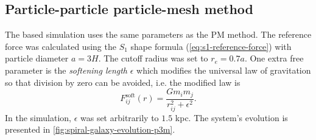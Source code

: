 \subsection{Particle-particle particle-mesh method}
The \PThreeM{} based simulation uses the same parameters as the PM method.
The reference force was calculated using the $S_1$ shape formula (\autoref{eq:s1-reference-force}) with particle diameter $a=3H$.
The cutoff radius was set to $r_e=0.7a$.
One extra free parameter is the \textit{softening length} $\epsilon$ which modifies the universal law of gravitation so that division by zero can be avoided, i.e. the modified law is
\begin{equation*}
    F^\text{soft}_{ij}(r) = \frac{G m_i m_j}{r_{ij}^2 + \epsilon^2}.
\end{equation*}
In the simulation, $\epsilon$ was set arbitrarily to $1.5$ kpc.
The system's evolution is presented in \autoref{fig:spiral-galaxy-evolution-p3m}.
